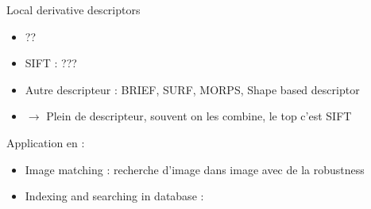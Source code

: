 \documentclass{article}
\theoremstyle{plain}%
\theoremstyle{definition}
\theoremstyle{remark}
\begin{document}
Local derivative descriptors
\begin{itemize}
    \item ??
    \item SIFT : ???
    \item Autre descripteur : BRIEF, SURF, MORPS, Shape based descriptor
    \item $\rightarrow$ Plein de descripteur, souvent on les combine, le top c'est SIFT 
\end{itemize}

Application en :
\begin{itemize}
    \item Image matching : recherche d'image dans image avec de la robustness
    \item Indexing and searching in database : 
\end{itemize}
\end{document}
